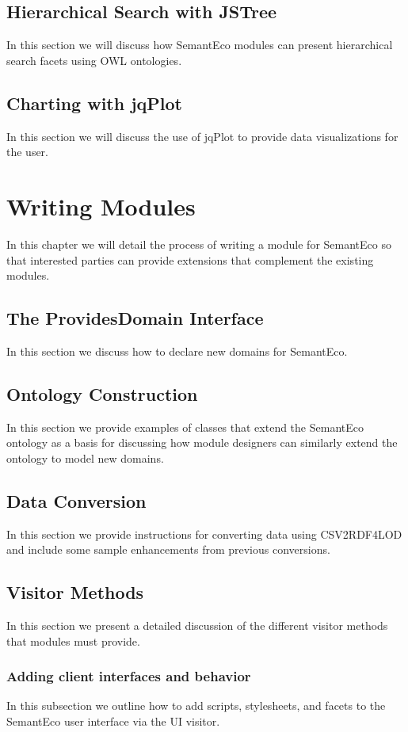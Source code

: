 \documentclass[letterpaper]{report}
\begin{document}
\section{Hierarchical Search with JSTree}
\label{hierarchical-search}
In this section we will discuss how SemantEco modules can present hierarchical search facets using OWL ontologies.
\section{Charting with jqPlot}
\label{visualization}
In this section we will discuss the use of jqPlot to provide data visualizations for the user.
\chapter{Writing Modules}
\label{writing-modules}
In this chapter we will detail the process of writing a module for SemantEco so that interested parties can provide extensions that complement the existing modules.
\section{The ProvidesDomain Interface}
In this section we discuss how to declare new domains for SemantEco.
\section{Ontology Construction}
In this section we provide examples of classes that extend the SemantEco ontology as a basis for discussing how module designers can similarly extend the ontology to model new domains.
\section{Data Conversion}
In this section we provide instructions for converting data using CSV2RDF4LOD \cite{lebo2011producing} and include some sample enhancements from previous conversions.
\section{Visitor Methods}
\label{visitors}
In this section we present a detailed discussion of the different visitor methods that modules must provide.
\subsection{Adding client interfaces and behavior}
In this subsection we outline how to add scripts, stylesheets, and facets to the SemantEco user interface via the UI visitor.
\end{document}
